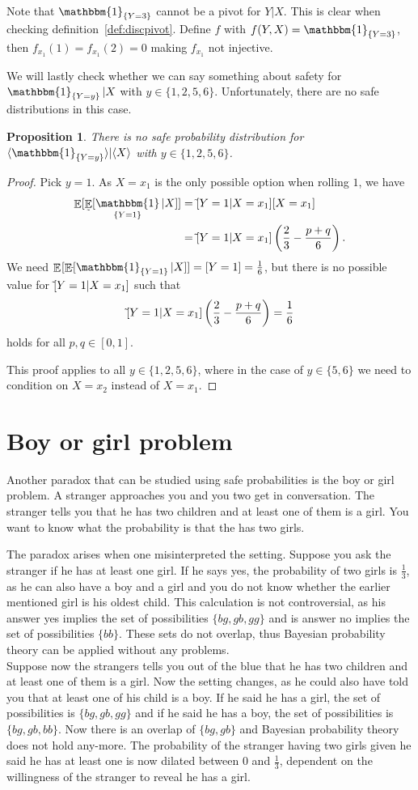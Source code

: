 \documentclass[twoside,a4paper]{article}
\theoremstyle{plain}
\newtheorem{proposition}[theorem]{Proposition}
\theoremstyle{definition}
\theoremstyle{remark}
\numberwithin{equation}{section}
\let\P\relax
\DeclareMathOperator{\P}{\mathbb{P}}
\DeclareMathOperator{\E}{\mathbb{E}}
\DeclareMathOperator{\1}{\mathbbm{1}}
\newcommand{\Psafe}{\tilde{\P}}
\newcommand{\DieInd}{\1_{\{Y=3\}}}
\begin{document}
Note that $\DieInd$ cannot be a pivot for $Y|X$. This is clear when checking definition~\ref{def:discpivot}. Define $f$ with $f(Y,X)=\DieInd$, then $f_{x_1}(1)=f_{x_1}(2)=0$ making $f_{x_1}$ not injective.

We will lastly check whether we can say something about safety for $\1_{\{Y=y\}}|X$ with $y\in\{1,2,5,6\}$. Unfortunately, there are no safe distributions in this case.
\begin{proposition}
There is no safe probability distribution for $\langle\1_{\{Y=y\}}\rangle|\langle X\rangle$ with $y\in\{1,2,5,6\}$.
\end{proposition}
\begin{proof}
Pick $y=1$. As $X=x_1$ is the only possible option when rolling $1$, we have
\begin{align*}
\E_{\P}[\E_{\Psafe}[\1_{\{Y=1\}}|X]]&=\Psafe[Y=1|X=x_1]\P[X=x_1]\\
&=\Psafe[Y=1|X=x_1]\left(\frac{2}{3}-\frac{p+q}{6}\right).
\end{align*}
We need $\E_{\P}[\E_{\Psafe}[\1_{\{Y=1\}}|X]]=\P[Y=1]=\frac{1}{6}$, but there is no possible value for $\Psafe[Y=1|X=x_1]$ such that 
\[\Psafe[Y=1|X=x_1]\left(\frac{2}{3}-\frac{p+q}{6}\right)=\frac{1}{6}\]
holds for all $p,q\in[0,1]$.

This proof applies to all $y\in\{1,2,5,6\}$, where in the case of $y\in\{5,6\}$ we need to condition on $X=x_2$ instead of $X=x_1$. 
\end{proof}

\section{Boy or girl problem}
Another paradox that can be studied using safe probabilities is the boy or girl problem. A stranger approaches you and you two get in conversation. The stranger tells you that he has two children and at least one of them is a girl. You want to know what the probability is that the has two girls.

The paradox arises when one misinterpreted the setting. Suppose you ask the stranger if he has at least one girl. If he says yes, the probability of two girls is $\frac{1}{3}$, as he can also have a boy and a girl and you do not know whether the earlier mentioned girl is his oldest child. This calculation is not controversial, as his answer yes implies the set of possibilities $\{bg, gb, gg\}$ and is answer no implies the set of possibilities $\{bb\}$. These sets do not overlap, thus Bayesian probability theory can be applied without any problems.\\
Suppose now the strangers tells you out of the blue that he has two children and at least one of them is a girl. Now the setting changes, as he could also have told you that at least one of his child is a boy. If he said he has a girl, the set of possibilities is $\{bg, gb, gg\}$ and if he said he has a boy, the set of possibilities is $\{bg, gb, bb\}$. Now there is an overlap of $\{bg, gb\}$ and Bayesian probability theory does not hold any-more. The probability of the stranger having two girls given he said he has at least one is now dilated between $0$ and $\frac{1}{3}$, dependent on the willingness of the stranger to reveal he has a girl.
\end{document}
